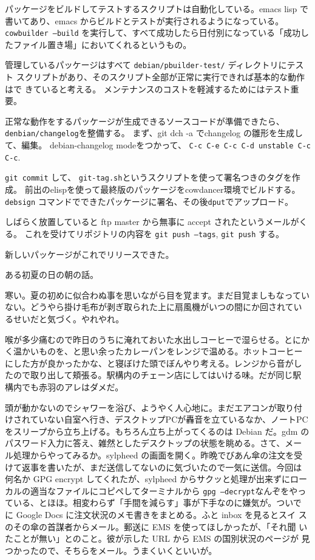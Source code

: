 \documentclass[mingoth,a4paper]{jsarticle}
\begin{document}
パッケージをビルドしてテストするスクリプトは自動化している。emacs lisp で
書いてあり、emacs からビルドとテストが実行されるようになっている。
\texttt{cowbuilder --build} を実行して、すべて成功したら日付別になっている「成功し
たファイル置き場」においてくれるというもの。

管理しているパッケージはすべて \texttt{debian/pbuilder-test/} ディレクトリにテスト
スクリプトがあり、そのスクリプト全部が正常に実行できれば基本的な動作はで
きていると考える。
メンテナンスのコストを軽減するためにはテスト重要。

正常な動作をするパッケージが生成できるソースコードが準備できたら、
\texttt{denbian/changelog}を整備する。
まず、git dch -a でchangelog の雛形を生成して、編集。
debian-changelog modeをつかって、 \texttt{C-c C-e C-c C-d unstable C-c C-c}.

\texttt{git commit} して、 \texttt{git-tag.sh}というスクリプトを使って署名つきのタグを作成。
前出のelispを使って最終版のパッケージをcowdancer環境でビルドする。
\texttt{debsign} コマンドでできたパッケージに署名、その後\texttt{dput}でアップロード。

しばらく放置していると
ftp master から無事に accept されたというメールがくる。
これを受けてリポジトリの内容を \texttt{git push --tags},  \texttt{git push} する。

新しいパッケージがこれでリリースできた。


 ある初夏の日の朝の話。

 寒い。夏の初めに似合わぬ事を思いながら目を覚ます。まだ目覚ましもなってい
 ない。どうやら掛け毛布が剥ぎ取られた上に扇風機がいつの間にか回されてい
 るせいだと気づく。やれやれ。

 喉が多少痛むので昨日のうちに淹れておいた水出しコーヒーで湿らせる。とにか
 く温かいものを、と思い余ったカレーパンをレンジで温める。ホットコーヒー
 にした方が良かったかな、と寝ぼけた頭でぼんやり考える。レンジから音がし
 たので取り出して頬張る。駅構内のチェーン店にしてはいける味。だが同じ駅
 構内でも赤羽のアレはダメだ。

 頭が動かないのでシャワーを浴び、ようやく人心地に。まだエアコンが取り付
 けされていない自室へ行き、デスクトップPCが轟音を立ているなか、ノートPC
 をスリープから立ち上げる。もちろん立ち上がってくるのは Debian だ。gdm
 のパスワード入力に答え、雑然としたデスクトップの状態を眺める。さて、メー
 ル処理からやってみるか。sylpheed の画面を開く。昨晩でびあん傘の注文を受
 けて返事を書いたが、まだ送信してないのに気づいたので一気に送信。今回は
 何名か GPG encrypt してくれたが、sylpheed からサクッと処理が出来ずにロー
 カルの適当なファイルにコピペしてターミナルから \texttt{gpg --decrypt}なんぞをやっ
 ている、とほほ。相変わらず「手間を減らす」事が下手なのに嫌気が。ついで
 に Google Docs に注文状況のメモ書きをまとめる。ふと inbox を見るとスイ
 スのその傘の首謀者からメール。郵送に EMS を使ってほしかったが、「それ聞
 いたことが無い」とのこと。彼が示した URL から EMS の国別状況のページが
 見つかったので、そちらをメール。うまくいくといいが。
\end{document}
